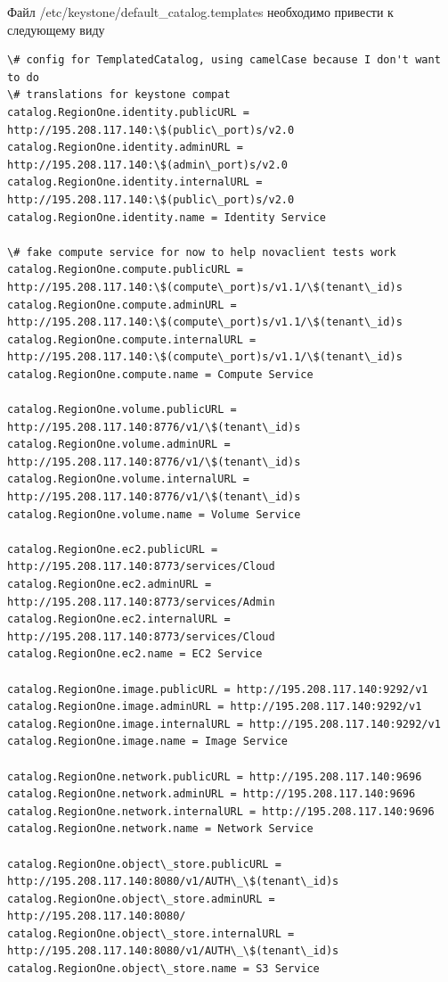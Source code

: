 \documentclass[letterpaper,10pt,russian]{sphinxmanual}
\begin{document}

Файл /etc/keystone/default\_catalog.templates необходимо привести к следующему виду

\begin{Verbatim}[commandchars=\\\{\}]
\# config for TemplatedCatalog, using camelCase because I don't want to do
\# translations for keystone compat
catalog.RegionOne.identity.publicURL = http://195.208.117.140:\$(public\_port)s/v2.0
catalog.RegionOne.identity.adminURL = http://195.208.117.140:\$(admin\_port)s/v2.0
catalog.RegionOne.identity.internalURL = http://195.208.117.140:\$(public\_port)s/v2.0
catalog.RegionOne.identity.name = Identity Service

\# fake compute service for now to help novaclient tests work
catalog.RegionOne.compute.publicURL = http://195.208.117.140:\$(compute\_port)s/v1.1/\$(tenant\_id)s
catalog.RegionOne.compute.adminURL = http://195.208.117.140:\$(compute\_port)s/v1.1/\$(tenant\_id)s
catalog.RegionOne.compute.internalURL = http://195.208.117.140:\$(compute\_port)s/v1.1/\$(tenant\_id)s
catalog.RegionOne.compute.name = Compute Service

catalog.RegionOne.volume.publicURL = http://195.208.117.140:8776/v1/\$(tenant\_id)s
catalog.RegionOne.volume.adminURL = http://195.208.117.140:8776/v1/\$(tenant\_id)s
catalog.RegionOne.volume.internalURL = http://195.208.117.140:8776/v1/\$(tenant\_id)s
catalog.RegionOne.volume.name = Volume Service

catalog.RegionOne.ec2.publicURL = http://195.208.117.140:8773/services/Cloud
catalog.RegionOne.ec2.adminURL = http://195.208.117.140:8773/services/Admin
catalog.RegionOne.ec2.internalURL = http://195.208.117.140:8773/services/Cloud
catalog.RegionOne.ec2.name = EC2 Service

catalog.RegionOne.image.publicURL = http://195.208.117.140:9292/v1
catalog.RegionOne.image.adminURL = http://195.208.117.140:9292/v1
catalog.RegionOne.image.internalURL = http://195.208.117.140:9292/v1
catalog.RegionOne.image.name = Image Service

catalog.RegionOne.network.publicURL = http://195.208.117.140:9696
catalog.RegionOne.network.adminURL = http://195.208.117.140:9696
catalog.RegionOne.network.internalURL = http://195.208.117.140:9696
catalog.RegionOne.network.name = Network Service

catalog.RegionOne.object\_store.publicURL = http://195.208.117.140:8080/v1/AUTH\_\$(tenant\_id)s
catalog.RegionOne.object\_store.adminURL = http://195.208.117.140:8080/
catalog.RegionOne.object\_store.internalURL = http://195.208.117.140:8080/v1/AUTH\_\$(tenant\_id)s
catalog.RegionOne.object\_store.name = S3 Service
\end{Verbatim}
\end{document}
